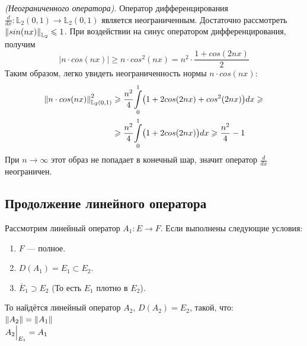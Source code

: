 \documentclass[12pt]{article}
\begin{document}
		\example \textit{(Неограниченного оператора)}. Оператор дифференцирования 
		$\frac{d}{dx} : \mathbb{L}_2(0, 1) \rightarrow \mathbb{L}_2(0, 1)$ является неограниченным. 
		Достаточно рассмотреть $\left\| sin(nx) \right\|_{\mathbb{L}_2} \leqslant 1$. При воздействии на синус оператором дифференцирования, получим
		$$|n \cdot cos(nx)| \geq n \cdot cos^2(nx) = n^2 \cdot \frac{1 + cos(2nx)}{2}$$
		Таким образом, легко увидеть неограниченность нормы $n \cdot cos(nx)$:
		\begin{align*}
			\left\| n \cdot cos(nx) \right\|_{\mathbb{L}_2(0,1)}^2 
			&\geqslant \frac{n^2}{4} \underset{0}{\overset{1}{\int}} \big(1 + 2 cos(2nx) + cos^2(2nx)\big) dx \geqslant \\
			&\geqslant \frac{n^2}{4} \underset{0}{\overset{1}{\int}} \big(1 + 2 cos(2nx)\big) dx \geqslant \frac{n^2}{4} - 1
		\end{align*}
		При $n \rightarrow \infty$ этот образ не попадает в конечный шар, значит оператор $\frac{d}{dx}$ неограничен.
	
	
	\subsection{Продолжение линейного оператора}

		\begin{theorem} \label{th:limitedOperContinue}
			Рассмотрим линейный оператор $A_1 : E \rightarrow F$. Если выполнены следующие условия:
			\begin{enumerate}
				\item $F$ --- полное.
				\item $D(A_1) = E_1 \subset E_2$.
				\item $\overline{E}_1 \supset E_2$ (То есть $E_1$ плотно в $E_2$).
			\end{enumerate}
			То найдётся линейный оператор $A_2,\, D(A_2) = E_2$, такой, что: \\
			$\left\| A_2 \right\| = \left\| A_1 \right\|$ \\
			$A_2 \Big|_{E_1}^{} = A_1$
		\end{theorem}
	
\end{document}
